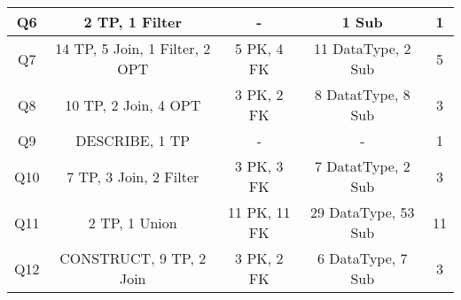 \begin{table}[th]
{\begin{tabular}{c|c|c|c|c}
Q6 & 2 TP, 1 Filter & - & 1 Sub & 1 \\ \hline
Q7 & 14 TP, 5 Join, 1 Filter, 2 OPT & 5 PK, 4 FK & 11 DataType, 2 Sub & 5 \\ \hline
Q8 & 10 TP, 2 Join, 4 OPT & 3 PK, 2 FK & 8 DatatType, 8 Sub & 3 \\ \hline
Q9 & DESCRIBE, 1 TP & - & - & 1 \\ \hline
Q10 & 7 TP, 3 Join, 2 Filter & 3 PK, 3 FK & 7 DatatType, 2 Sub & 3 \\ \hline
Q11 & 2 TP, 1 Union & 11 PK, 11 FK & 29 DataType, 53 Sub & 11 \\ \hline
Q12 & CONSTRUCT, 9 TP, 2 Join & 3 PK, 2 FK & 6 DataType, 7 Sub & 3 \\ \hline
\end{tabular}%
}
\end{table}